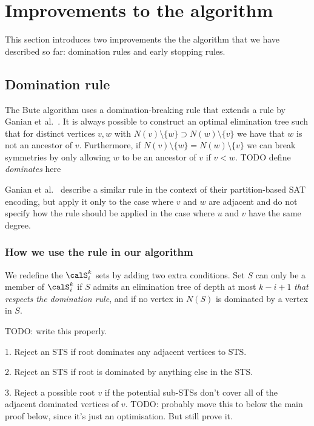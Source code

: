 \section{Improvements to the algorithm}\label{sec:improvements}

This section introduces two improvements the the algorithm that we have described so far:
domination rules and early stopping rules.

\subsection{Domination rule}

The Bute algorithm uses a domination-breaking rule that extends a rule
by Ganian et al.\ \cite{DBLP:conf/alenex/GanianLOS19,DBLP:journals/corr/abs-1911-12995}.
It is always
possible to construct an optimal elimination tree
such that for distinct vertices $v,w$ with 
$N(v) \setminus \{w\} \supset N(w) \setminus \{v\}$
we have that $w$ is not an ancestor of $v$.
Furthermore, if $N(v) \setminus \{w\} = N(w) \setminus \{v\}$
we can break symmetries by only allowing $w$ to be an ancestor
of $v$ if $v < w$.
TODO define \emph{dominates} here

Ganian et al.\ \cite{DBLP:conf/alenex/GanianLOS19,DBLP:journals/corr/abs-1911-12995}
describe a similar rule in the context of their partition-based SAT encoding,
but apply it only to the case where $v$ and $w$ are adjacent and do not specify
how the rule should be applied in the case where $u$ and $v$ have the same degree.

\subsubsection{How we use the rule in our algorithm}

We redefine the $\calS_i^k$ sets by adding two extra conditions.
Set $S$ can only be a member of $\calS_i^k$ if $S$ admits an elimination
tree of depth at most $k-i+1$ \emph{that respects the domination rule},
and if no vertex in $N(S)$ is dominated by a vertex in $S$.

TODO: write this properly.

1. Reject an STS if root dominates any adjacent vertices to STS.

2. Reject an STS if root is dominated by anything else in the STS.

3. Reject a possible root $v$ if the potential sub-STSs don't cover all of the
   adjacent dominated vertices of $v$.  TODO: probably move this
   to below the main proof below, since it's just an optimisation.
   But still prove it.

